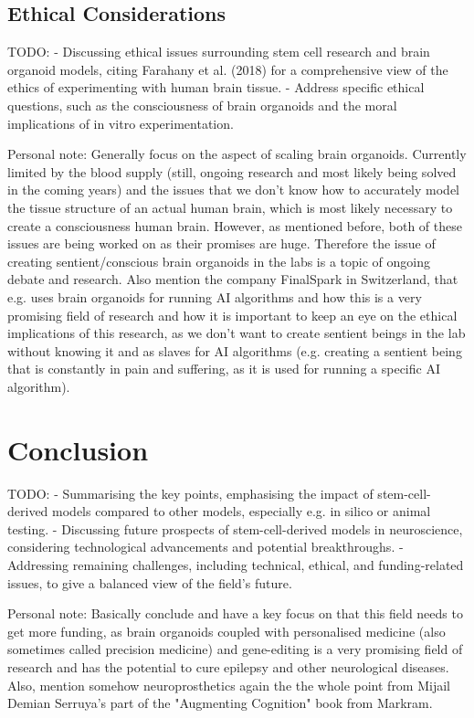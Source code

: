 \documentclass[10pt]{article}
\begin{document}
\begin{sloppypar}
  \subsection{Ethical Considerations}
  \label{sec:ethical-considerations}

  TODO:
  - Discussing ethical issues surrounding stem cell research and brain organoid models, citing Farahany et al. (2018) for a comprehensive view of the ethics of experimenting with human brain tissue.
  - Address specific ethical questions, such as the consciousness of brain organoids and the moral implications of in vitro experimentation.

  Personal note: Generally focus on the aspect of scaling brain organoids. Currently limited by the blood supply (still, ongoing research and most likely being solved in the coming years) and the issues that we don't know how to accurately model the tissue structure of an actual human brain, which is most likely necessary to create a consciousness human brain. However, as mentioned before, both of these issues are being worked on as their promises are huge. Therefore the issue of creating sentient/conscious brain organoids in the labs is a topic of ongoing debate and research. Also mention the company FinalSpark in Switzerland, that e.g. uses brain organoids for running AI algorithms and how this is a very promising field of research and how it is important to keep an eye on the ethical implications of this research, as we don't want to create sentient beings in the lab without knowing it and as slaves for AI algorithms (e.g. creating a sentient being that is constantly in pain and suffering, as it is used for running a specific AI algorithm).

  \section{Conclusion}
  \label{sec:conclusion}

  TODO:
  - Summarising the key points, emphasising the impact of stem-cell-derived models compared to other models, especially e.g. in silico or animal testing.
  - Discussing future prospects of stem-cell-derived models in neuroscience, considering technological advancements and potential breakthroughs.
  - Addressing remaining challenges, including technical, ethical, and funding-related issues, to give a balanced view of the field's future.

  Personal note: Basically conclude and have a key focus on that this field needs to get more funding, as brain organoids coupled with personalised medicine (also sometimes called precision medicine) and gene-editing is a very promising field of research and has the potential to cure epilepsy and other neurological diseases. Also, mention somehow neuroprosthetics again the the whole point from Mijail Demian Serruya's part of the "Augmenting Cognition" book from Markram.


  \pagebreak
  
  

\end{sloppypar}
\end{document}
